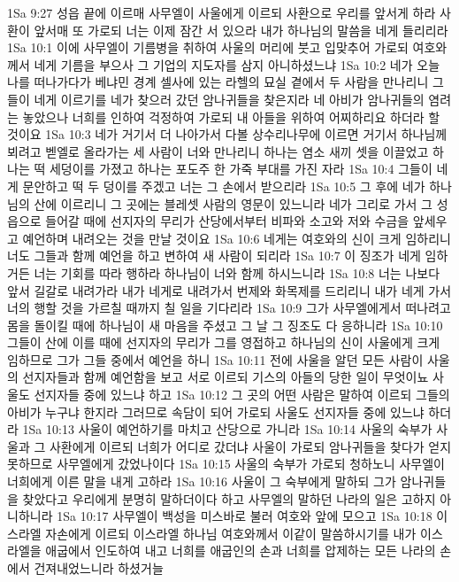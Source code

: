 1Sa 9:27  성읍 끝에 이르매 사무엘이 사울에게 이르되 사환으로 우리를 앞서게 하라 사환이 앞서매 또 가로되 너는 이제 잠간 서 있으라 내가 하나님의 말씀을 네게 들리리라
1Sa 10:1  이에 사무엘이 기름병을 취하여 사울의 머리에 붓고 입맞추어 가로되 여호와께서 네게 기름을 부으사 그 기업의 지도자를 삼지 아니하셨느냐
1Sa 10:2  네가 오늘 나를 떠나가다가 베냐민 경계 셀사에 있는 라헬의 묘실 곁에서 두 사람을 만나리니 그들이 네게 이르기를 네가 찾으러 갔던 암나귀들을 찾은지라 네 아비가 암나귀들의 염려는 놓았으나 너희를 인하여 걱정하여 가로되 내 아들을 위하여 어찌하리요 하더라 할 것이요
1Sa 10:3  네가 거기서 더 나아가서 다볼 상수리나무에 이르면 거기서 하나님께 뵈려고 벧엘로 올라가는 세 사람이 너와 만나리니 하나는 염소 새끼 셋을 이끌었고 하나는 떡 세덩이를 가졌고 하나는 포도주 한 가죽 부대를 가진 자라
1Sa 10:4  그들이 네게 문안하고 떡 두 덩이를 주겠고 너는 그 손에서 받으리라
1Sa 10:5  그 후에 네가 하나님의 산에 이르리니 그 곳에는 블레셋 사람의 영문이 있느니라 네가 그리로 가서 그 성읍으로 들어갈 때에 선지자의 무리가 산당에서부터 비파와 소고와 저와 수금을 앞세우고 예언하며 내려오는 것을 만날 것이요
1Sa 10:6  네게는 여호와의 신이 크게 임하리니 너도 그들과 함께 예언을 하고 변하여 새 사람이 되리라
1Sa 10:7  이 징조가 네게 임하거든 너는 기회를 따라 행하라 하나님이 너와 함께 하시느니라
1Sa 10:8  너는 나보다 앞서 길갈로 내려가라 내가 네게로 내려가서 번제와 화목제를 드리리니 내가 네게 가서 너의 행할 것을 가르칠 때까지 칠 일을 기다리라
1Sa 10:9  그가 사무엘에게서 떠나려고 몸을 돌이킬 때에 하나님이 새 마음을 주셨고 그 날 그 징조도 다 응하니라
1Sa 10:10  그들이 산에 이를 때에 선지자의 무리가 그를 영접하고 하나님의 신이 사울에게 크게 임하므로 그가 그들 중에서 예언을 하니
1Sa 10:11  전에 사울을 알던 모든 사람이 사울의 선지자들과 함께 예언함을 보고 서로 이르되 기스의 아들의 당한 일이 무엇이뇨 사울도 선지자들 중에 있느냐 하고
1Sa 10:12  그 곳의 어떤 사람은 말하여 이르되 그들의 아비가 누구냐 한지라 그러므로 속담이 되어 가로되 사울도 선지자들 중에 있느냐 하더라
1Sa 10:13  사울이 예언하기를 마치고 산당으로 가니라
1Sa 10:14  사울의 숙부가 사울과 그 사환에게 이르되 너희가 어디로 갔더냐 사울이 가로되 암나귀들을 찾다가 얻지 못하므로 사무엘에게 갔었나이다
1Sa 10:15  사울의 숙부가 가로되 청하노니 사무엘이 너희에게 이른 말을 내게 고하라
1Sa 10:16  사울이 그 숙부에게 말하되 그가 암나귀들을 찾았다고 우리에게 분명히 말하더이다 하고 사무엘의 말하던 나라의 일은 고하지 아니하니라
1Sa 10:17  사무엘이 백성을 미스바로 불러 여호와 앞에 모으고
1Sa 10:18  이스라엘 자손에게 이르되 이스라엘 하나님 여호와께서 이같이 말씀하시기를 내가 이스라엘을 애굽에서 인도하여 내고 너희를 애굽인의 손과 너희를 압제하는 모든 나라의 손에서 건져내었느니라 하셨거늘
